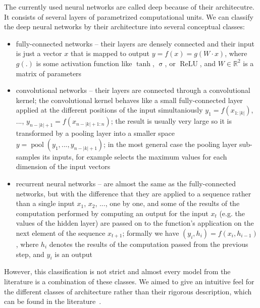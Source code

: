 \documentclass[10pt,twocolumn]{article}
\begin{document}
The currently used neural networks are called deep because of their architecutre. It consists of several layers of parametrized computational units. We can classify the deep neural networks by their architecture into several conceptual classes:
\begin{itemize}
  \item fully-connected networks -- their layers are densely connected and their input is just a vector $x$ that is mapped to output $y=f(x)=g(W\cdot x)$, where $g(.)$ is some activation function like $\operatorname{tanh}$, $\operatorname{\sigma}$, or $\operatorname{ReLU}$, and $W\in \mathbb{R}^2$ is a matrix of parameters
  \item convolutional networks -- their layers are connected through a convolutional kernel; the convolutional kernel behaves like a small fully-connected layer applied at the different positions of the input simultaniously $y_1=f(x_{1:|k|})$, ..., $y_{n-|k|+1}=f(x_{n-|k|+1:n})$; the result is usually very large so it is transformed by a pooling layer into a smaller space $y=\operatorname{pool}(y_1, ..., y_{n-|k|+1})$; in the most general case the pooling layer sub-samples its inputs, for example selects the maximum values for each dimension of the input vectors
  \item recurrent neural networks -- are almost the same as the fully-connected networks, but with the difference that they are applied to a sequence rather than a single input $x_1$, $x_2$, ..., one by one, and some of the results of the computation performed by computing an output for the input $x_t$ (e.g. the values of the hidden layer) are passed on to the function's application on the next element of the sequence $x_{t+1}$; formally we have $(y_i, h_i) = f(x_i, h_{i-1})$, where $h_i$ denotes the results of the computation passed from the previous step, and $y_i$ is an output
\end{itemize}
However, this classification is not strict and almost every model from the literature is a combination of these classes. We aimed to give an intuitive feel for the different classes of architecture rather than their rigorous description, which can be found in the literature~\cite{graves2013generating}.
\end{document}
